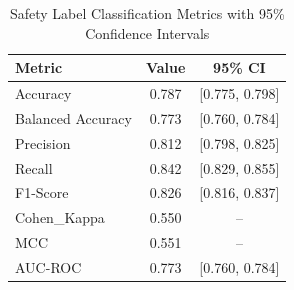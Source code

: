 \begin{table}[h]
\centering
\caption{Safety Label Classification Metrics with 95\% Confidence Intervals}
\label{tab:metrics}
\begin{tabular}{lcc}
\hline
Metric & Value & 95\% CI \\
\hline
Accuracy & 0.787 & [0.775, 0.798] \\
Balanced Accuracy & 0.773 & [0.760, 0.784] \\
Precision & 0.812 & [0.798, 0.825] \\
Recall & 0.842 & [0.829, 0.855] \\
F1-Score & 0.826 & [0.816, 0.837] \\
Cohen_Kappa & 0.550 & -- \\
MCC & 0.551 & -- \\
AUC-ROC & 0.773 & [0.760, 0.784] \\
\hline
\end{tabular}
\end{table}